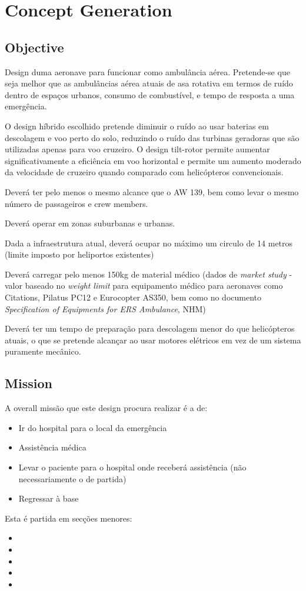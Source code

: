 \section{Concept Generation}
\label{concept}

\subsection{Objective}
Design duma aeronave para funcionar como ambulância aérea. Pretende-se que seja melhor que as ambulâncias aérea atuais de asa rotativa em termos de ruído dentro de espaços urbanos, consumo de combustível, e tempo de resposta a uma emergência.\par
O design híbrido escolhido pretende diminuir o ruído ao usar baterias em descolagem e voo perto do solo, reduzindo o ruído das turbinas geradoras que são utilizadas apenas para voo cruzeiro. O design tilt-rotor permite aumentar significativamente a eficiência em voo horizontal e permite um aumento moderado da velocidade de cruzeiro quando comparado com helicópteros convencionais. \par
Deverá ter pelo menos o mesmo alcance que o AW 139, bem como levar o mesmo número de passageiros e crew members.\par
Deverá operar em zonas suburbanas e urbanas.\par
Dada a infraestrutura atual, deverá ocupar no máximo um circulo de 14 metros (limite imposto por heliportos existentes)\par
Deverá carregar pelo menos 150kg de material médico (dados de \textit{market study} - valor baseado no \textit{weight limit} para equipamento médico para aeronaves como Citations, Pilatus PC12 e Eurocopter AS350, bem como no documento \textit{Specification of Equipments for ERS Ambulance}, NHM) %

Deverá ter um tempo de preparação para descolagem menor do que helicópteros atuais, o que se pretende alcançar ao usar motores elétricos em vez de um sistema puramente mecânico.\par

\subsection{Mission}
A overall missão que este design procura realizar é a de: 
\begin{itemize}
    \item Ir do hospital para o local da emergência
    \item Assistência médica
    \item Levar o paciente para o hospital onde receberá assistência (não necessariamente o de partida)
    \item Regressar à base
\end{itemize}
Esta é partida em secções menores:
\begin{itemize}
    \item 
    \item
    \item
    \item
    \item
\end{itemize}
